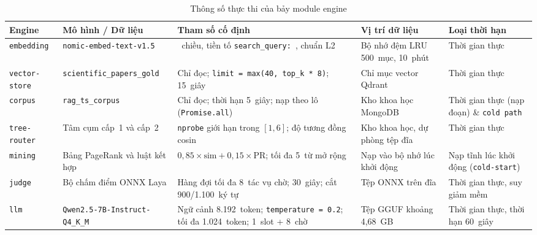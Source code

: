 \begin{table}[htbp]
\centering
\caption{Thông số thực thi của bảy module engine}
\label{tab:thong-so-bay-engine}
\footnotesize
\setlength{\tabcolsep}{4pt}
\begin{tabularx}{\textwidth}{
  >{\raggedright\arraybackslash}p{2.2cm}
  >{\raggedright\arraybackslash}p{3.0cm}
  >{\raggedright\arraybackslash}p{4.3cm}
  >{\raggedright\arraybackslash}p{2.7cm}
  >{\raggedright\arraybackslash}X
}
\toprule
\textbf{Engine} & \textbf{Mô hình / Dữ liệu} & \textbf{Tham số cố định} & \textbf{Vị trí dữ liệu} & \textbf{Loại thời hạn} \\
\midrule
\texttt{embedding} & \texttt{nomic-\allowbreak{}embed-\allowbreak{}text-\allowbreak{}v1.5} & 768~chiều, tiền tố \texttt{search\_query: }, chuẩn L2 & Bộ nhớ đệm LRU 500~mục, 10~phút & Thời gian thực \\
\midrule
\texttt{vector-\allowbreak{}store} & \texttt{scientific\_\allowbreak{}papers\_\allowbreak{}gold} & Chỉ đọc; \texttt{limit = max(40, top\_k * 8)}; 15~giây & Chỉ mục vector Qdrant & Thời gian thực \\
\midrule
\texttt{corpus} & \texttt{rag\_\allowbreak{}ts\_\allowbreak{}corpus} & Chỉ đọc; thời hạn 5~giây; nạp theo lô (\texttt{Promise.all}) & Kho khoa học MongoDB & Thời gian thực (nạp đoạn) \& \texttt{cold path} \\
\midrule
\texttt{tree-\allowbreak{}router} & Tâm cụm cấp~1 và cấp~2 & \texttt{nprobe} giới hạn trong $[1, 6]$; độ tương đồng cosin & Kho khoa học, dự phòng tệp đĩa & Thời gian thực \\
\midrule
\texttt{mining} & Bảng PageRank và luật kết hợp & $0{,}85 \times \text{sim} + 0{,}15 \times \text{PR}$; tối đa 5~từ mở rộng & Nạp vào bộ nhớ lúc khởi động & Nạp tĩnh lúc khởi động (\texttt{cold-start}) \\
\midrule
\texttt{judge} & Bộ chấm điểm ONNX Laya & Hàng đợi tối đa 8~tác vụ chờ; 30~giây; cắt 900/1.100~ký tự & Tệp ONNX trên đĩa & Thời gian thực, suy giảm mềm \\
\midrule
\texttt{llm} & \texttt{Qwen2.5-\allowbreak{}7B-\allowbreak{}Instruct-\allowbreak{}Q4\_\allowbreak{}K\_\allowbreak{}M} & Ngữ cảnh 8.192~token; \texttt{temperature = 0.2}; tối đa 1.024~token; 1~slot + 8~chờ & Tệp GGUF khoảng 4,68~GB & Thời gian thực, thời hạn 60~giây \\
\bottomrule
\end{tabularx}
\end{table}

